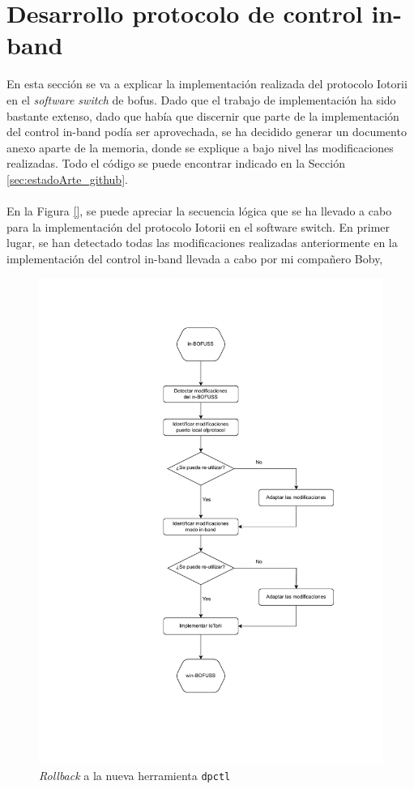\section{Desarrollo protocolo de control in-band}
\label{sec:bofussDEV}


En esta sección se va a explicar la implementación realizada del protocolo Iotorii en el \textit{software switch} de \gls{bofus}. Dado que el trabajo de implementación ha sido bastante extenso, dado que había que discernir que parte de la implementación del control in-band podía ser aprovechada, se ha decidido generar un documento anexo \cite{davidBOFUSS} aparte de la memoria, donde se explique a bajo nivel las modificaciones realizadas. Todo el código se puede encontrar indicado en la Sección \ref{sec:estadoArte_github}. \\
\\
En la Figura \ref{}, se puede apreciar la secuencia lógica que se ha llevado a cabo para la implementación del protocolo Iotorii en el software switch. En primer lugar, se han detectado todas las modificaciones realizadas anteriormente en la implementación del control in-band llevada a cabo por mi compañero Boby,


\begin{figure}[ht]
    \centering
    \includegraphics[width=\textwidth]{archivos/img/dev/WIN-BOFUSS.drawio.pdf}
    \caption{\textit{Rollback} a la nueva herramienta \texttt{dpctl}}
    \label{fig:WIN-BOFUSS}
\end{figure}


